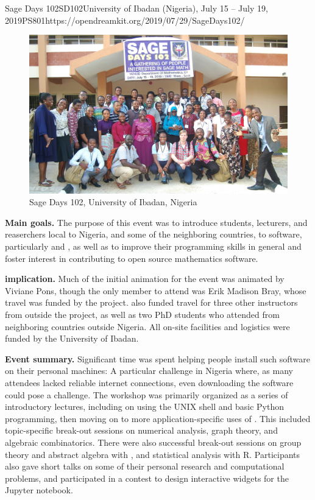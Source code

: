 \begin{event}{Sage Days 102}{SD102}{University of Ibadan (Nigeria), July 15 -- July 19, 2019}{PS}{80}{1}{https://opendreamkit.org/2019/07/29/SageDays102/}

\begin{figure}[ht]
  \includegraphics[width=.75\textwidth]{days102_group.jpg}
  \caption*{Sage Days 102, University of Ibadan, Nigeria}
\end{figure}

\textbf{Main goals.} The purpose of this event was to introduce students,
lecturers, and reaserchers local to Nigeria, and some of the
neighboring countries, to \ODK software, particularly \Sage and \GAP,
as well as to improve their programming skills in general and foster
interest in contributing to open source mathematics software.

\textbf{\ODK implication.} Much of the initial animation for the event was
animated by Viviane Pons, though the only \ODK member to attend was
Erik Madison Bray, whose travel was funded by the project.  \ODK also
funded travel for three other instructors from outside the project, as
well as two PhD students who attended from neighboring countries
outside Nigeria.  All on-site facilities and logistics were funded by the
University of Ibadan.

\textbf{Event summary.} Significant time was spent helping people install such
software on their personal machines: A particular challenge in Nigeria
where, as many attendees lacked reliable internet connections, even
downloading the software could pose a challenge.  The workshop was
primarily organized as a series of introductory lectures, including on
using the UNIX shell and basic Python programming, then moving on to
more application-specific uses of \Sage.  This included
topic-specific break-out sessions on numerical analysis, graph
theory, and algebraic combinatorics.  There were also successful
break-out sessions on group theory and abstract algebra with \GAP, and
statistical analysis with R. Participants also gave short talks on some
of their personal research and computational problems, and
participated in a contest to design interactive widgets for the Jupyter
notebook.


\end{event}
